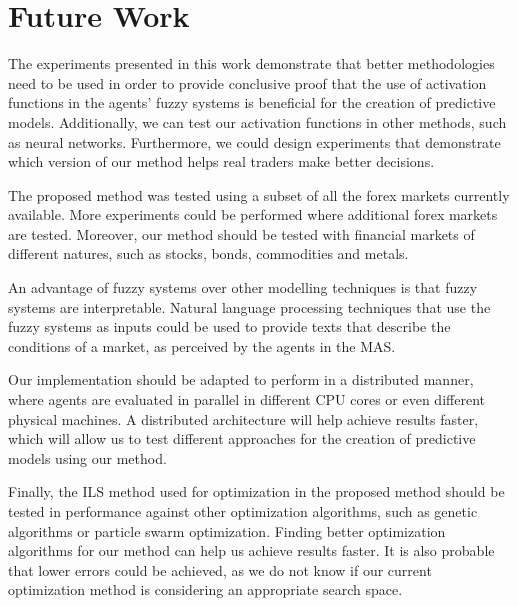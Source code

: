 \documentclass{ieeeaccess}
\begin{document}
\section{Future Work}
\label{section:future-work}

The experiments presented in this work demonstrate that better
methodologies need to be used in order to provide conclusive proof
that the use of activation functions in the agents' fuzzy systems is
beneficial for the creation of predictive models. Additionally, we can
test our activation functions in other methods, such as neural
networks. Furthermore, we could design experiments that demonstrate
which version of our method helps real traders make better decisions.

The proposed method was tested using a subset of all the forex markets
currently available. More experiments could be performed where
additional forex markets are tested. Moreover, our method should be
tested with financial markets of different natures, such as stocks,
bonds, commodities and metals.

An advantage of fuzzy systems over other modelling techniques is that
fuzzy systems are interpretable. Natural language processing
techniques that use the fuzzy systems as inputs could be used to
provide texts that describe the conditions of a market, as perceived
by the agents in the MAS.

Our implementation should be adapted to perform in a distributed
manner, where agents are evaluated in parallel in different CPU cores
or even different physical machines. A distributed architecture will
help achieve results faster, which will allow us to test different
approaches for the creation of predictive models using our method.

Finally, the ILS method used for optimization in the proposed method should be
tested in performance against other optimization algorithms, such as genetic
algorithms or particle swarm optimization. Finding better optimization
algorithms for our method can help us achieve results faster. It is
also probable that lower errors could be achieved, as we do not know
if our current optimization method is considering an appropriate
search space.


\end{document}

